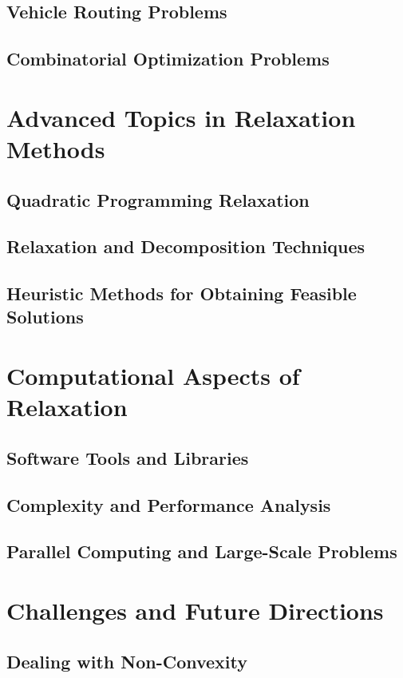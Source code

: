 \documentclass[12pt]{book} %
\begin{document}
\subsection{Vehicle Routing Problems}
\subsection{Combinatorial Optimization Problems}

\section{Advanced Topics in Relaxation Methods}
\subsection{Quadratic Programming Relaxation}
\subsection{Relaxation and Decomposition Techniques}
\subsection{Heuristic Methods for Obtaining Feasible Solutions}

\section{Computational Aspects of Relaxation}
\subsection{Software Tools and Libraries}
\subsection{Complexity and Performance Analysis}
\subsection{Parallel Computing and Large-Scale Problems}

\section{Challenges and Future Directions}
\subsection{Dealing with Non-Convexity}
\end{document}
